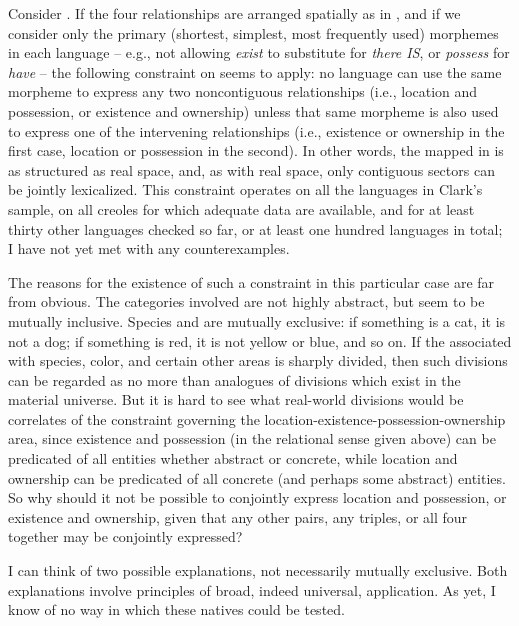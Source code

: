 Consider . %
If the four relationships are arranged spatially as in , and if we consider only the primary (shortest, simplest, most frequently used) morphemes in each language -- e.g., not allowing \textit{exist} to substitute for \textit{there \textsc{IS}}, or \textit{possess} for \textit{have} -- the following constraint on  seems to apply: no language can use the same mor\-pheme to express any two noncontiguous relationships (i.e., location and possession, or existence and ownership) unless that same morpheme is also used to express one of the intervening relationships (i.e., existence or ownership in the first case, location or possession in the second). In other words, the  mapped in  is as structured as real space, and, as with real space, only contiguous sectors can be jointly lexicalized. This constraint operates on all the languages in Clark's sample, on all creoles for which adequate
data are available, and for at least thirty other languages checked so far, or at least one hundred languages in total;\enlargethispage{1\baselineskip} I have not yet met with any counterexamples.

The reasons for the existence of such a constraint in this particular case are far from obvious. The categories involved are not highly abstract, but seem to be mutually inclusive. Species and  are mutually exclusive: if something is a cat, it is not a dog; if something is red, it is not yellow or blue, and so on. If the  associated with species, color, and certain other areas is sharply divided, then such divisions can be regarded as no more than analogues of divisions which exist in the material universe. But it is hard to see what real-world divisions would be correlates of the constraint governing the location-existence-possession-ownership area, since existence and possession (in the relational sense given above) can be predicated of all entities whether abstract or concrete, while location and ownership can be predicated of all concrete (and perhaps some abstract) entities. So why should it not be possible to conjointly express location and possession, or existence and ownership, given that any other pairs, any triples, or all four together may be conjointly expressed?

I can think of two possible explanations, not necessarily mutually exclusive. Both explanations involve principles of broad, indeed universal, application. As yet, I know of no way in which these natives could be tested.

